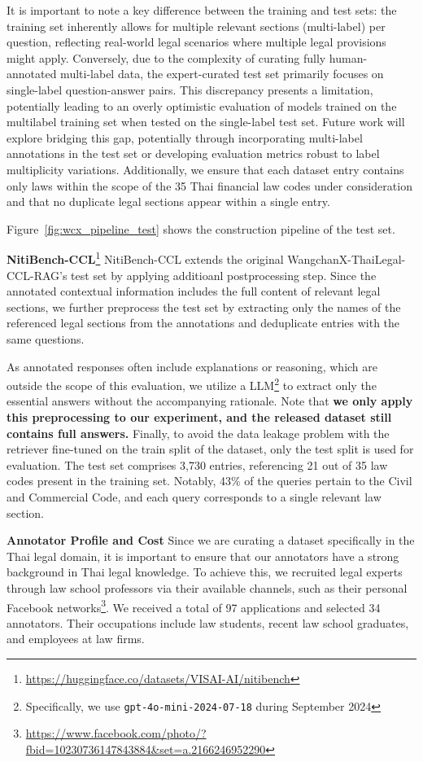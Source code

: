 It is important to note a key difference between the training and test sets: the training set inherently allows for multiple relevant sections (multi-label) per question, reflecting real-world legal scenarios where multiple legal provisions might apply. 
%
Conversely, due to the complexity of curating fully human-annotated multi-label data, the expert-curated test set primarily focuses on single-label question-answer pairs.
%
This discrepancy presents a limitation, potentially leading to an overly optimistic evaluation of models trained on the multilabel training set when tested on the single-label test set. 
%
Future work will explore bridging this gap, potentially through incorporating multi-label annotations in the test set or developing evaluation metrics robust to label multiplicity variations.
%
Additionally, we ensure that each dataset entry contains only laws within the scope of the 35 Thai financial law codes under consideration and that no duplicate legal sections appear within a single entry.

Figure~\ref{fig:wcx_pipeline_test} shows the construction pipeline of the test set.

\textbf{NitiBench-CCL}\footnote{\url{https://huggingface.co/datasets/VISAI-AI/nitibench}} NitiBench-CCL extends the original WangchanX-ThaiLegal-CCL-RAG's test set by applying additioanl postprocessing step. Since the annotated contextual information includes the full content of relevant legal sections, we further preprocess the test set by extracting only the names of the referenced legal sections from the annotations and deduplicate entries with the same questions. 


%
As annotated responses often include explanations or reasoning, which are outside the scope of this evaluation, we utilize a LLM\footnote{Specifically, we use \texttt{gpt-4o-mini-2024-07-18}\cite{gpt4o} during September 2024} to extract only the essential answers without the accompanying rationale. 
%
Note that \textbf{we only apply this preprocessing to our experiment, and the released dataset still contains full answers.} 
%
Finally, to avoid the data leakage problem with the retriever fine-tuned on the train split of the dataset, only the test split is used for evaluation. 
%
The test set comprises 3,730 entries, referencing 21 out of 35 law codes present in the training set. 
%
Notably, 43\% of the queries pertain to the Civil and Commercial Code, and each query corresponds to a single relevant law section.

\textbf{Annotator Profile and Cost} 
%
Since we are curating a dataset specifically in the Thai legal domain, it is important to ensure that our annotators have a strong background in Thai legal knowledge. 
%
To achieve this, we recruited legal experts through law school professors via their available channels, such as their personal Facebook networks\footnote{\href{https://www.facebook.com/photo/?fbid=10230736147843884\&set=a.2166246952290}{https://www.facebook.com/photo/?fbid=10230736147843884\&set=a.2166246952290}}. 
%
We received a total of 97 applications and selected 34 annotators. 
%
Their occupations include law students, recent law school graduates, and employees at law firms.

